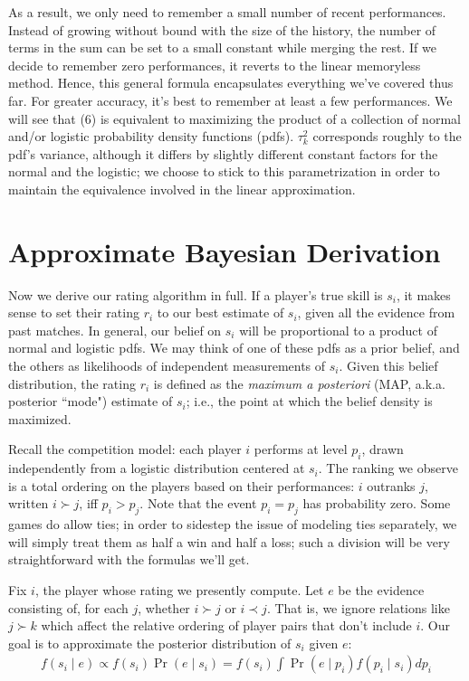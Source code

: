 \documentclass{article}
\begin{document}
As a result, we only need to remember a small number of recent performances. Instead of growing without bound with the size of the history, the number of terms in the sum can be set to a small constant while merging the rest. If we decide to remember zero performances, it reverts to the linear memoryless method. Hence, this general formula encapsulates everything we've covered thus far. For greater accuracy, it's best to remember at least a few performances. We will see that (6) is equivalent to maximizing the product of a collection of normal and/or logistic probability density functions (pdfs). $\tau_k^2$ corresponds roughly to the pdf's variance, although it differs by slightly different constant factors for the normal and the logistic; we choose to stick to this parametrization in order to maintain the equivalence involved in the linear approximation.

\section{Approximate Bayesian Derivation}

Now we derive our rating algorithm in full. If a player's true skill is $s_i$, it makes sense to set their rating $r_i$ to our best estimate of $s_i$, given all the evidence from past matches. In general, our belief on $s_i$ will be proportional to a product of normal and logistic pdfs. We may think of one of these pdfs as a prior belief, and the others as likelihoods of independent measurements of $s_i$. Given this belief distribution, the rating $r_i$ is defined as the \emph{maximum a posteriori} (MAP, a.k.a. posterior ``mode") estimate of $s_i$; i.e., the point at which the belief density is maximized.

Recall the competition model: each player $i$ performs at level $p_i$, drawn independently from a logistic distribution centered at $s_i$. The ranking we observe is a total ordering on the players based on their performances: $i$ outranks $j$, written $i \succ j$, iff $p_i > p_j$. Note that the event $p_i = p_j$ has probability zero. Some games do allow ties; in order to sidestep the issue of modeling ties separately, we will simply treat them as half a win and half a loss; such a division will be very straightforward with the formulas we'll get.

Fix $i$, the player whose rating we presently compute. Let $e$ be the evidence consisting of, for each $j$, whether $i \succ j$ or $i \prec j$. That is, we ignore relations like $j \succ k$ which affect the relative ordering of player pairs that don't include $i$. Our goal is to approximate the posterior distribution of $s_i$ given $e$:
\begin{align}
f(s_i\mid e) \propto f(s_i)\Pr(e\mid s_i) = f(s_i)\int \Pr(e\mid p_i)f(p_i\mid s_i)dp_i
\end{align}
\end{document}
